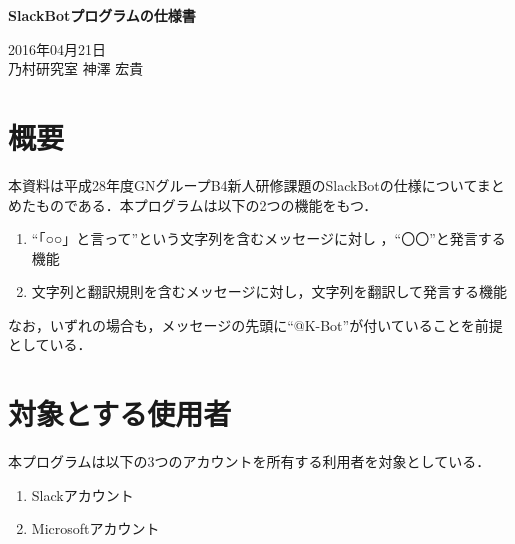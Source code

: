 \documentclass[fleqn, 14pt]{sty/extarticlej}
\begin{document}
\begin{center}
  {\Large {\bf SlackBotプログラムの仕様書}}

\end{center}
\begin{flushright}
  2016年04月21日\\

  乃村研究室 神澤 宏貴
\end{flushright}
\section{概要}
本資料は平成28年度GNグループB4新人研修課題のSlackBotの仕様についてまとめたものである．本プログラムは以下の2つの機能をもつ．
\begin{enumerate}
\item ``「○○」と言って''という文字列を含むメッセージに対し ，``〇〇''と発言する機能
\item 文字列と翻訳規則を含むメッセージに対し，文字列を翻訳して発言する機能
\end{enumerate}

なお，いずれの場合も，メッセージの先頭に``@K-Bot''が付いていることを前提としている．

\section{対象とする使用者}
本プログラムは以下の3つのアカウントを所有する利用者を対象としている．
\begin{enumerate}
\item Slackアカウント
\item Microsoftアカウント
\end{enumerate}
\end{document}
